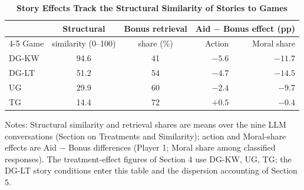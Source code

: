 \begin{table}[!htbp]
\centering
\small
\renewcommand{\arraystretch}{1.15}
\caption{\textbf{Story Effects Track the Structural Similarity of Stories to Games}}
\label{tab:similarity_gradient}
\begin{tabular}{l cc rr}
\toprule
 & Structural & Bonus retrieval & \multicolumn{2}{c}{Aid $-$ Bonus effect (pp)} \\
\cmidrule(lr){4-5}
Game & similarity (0--100) & share (\%) & Action & Moral share \\
\midrule
DG-KW & 94.6 & 41 & $-5.6$ & $-11.7$ \\
DG-LT & 51.2 & 54 & $-4.7$ & $-14.5$ \\
UG & 29.9 & 60 & $-2.4$ & $-9.7$ \\
TG & 14.4 & 72 & $+0.5$ & $-0.4$ \\
\bottomrule
\end{tabular}
\begin{flushleft}
\footnotesize Notes: Structural similarity and retrieval shares are means over the nine LLM conversations (Section on Treatments and Similarity); action and Moral-share effects are Aid $-$ Bonus differences (Player 1; Moral share among classified responses). The treatment-effect figures of Section 4 use DG-KW, UG, TG\@; the DG-LT story conditions enter this table and the dispersion accounting of Section 5.
\end{flushleft}
\end{table}
